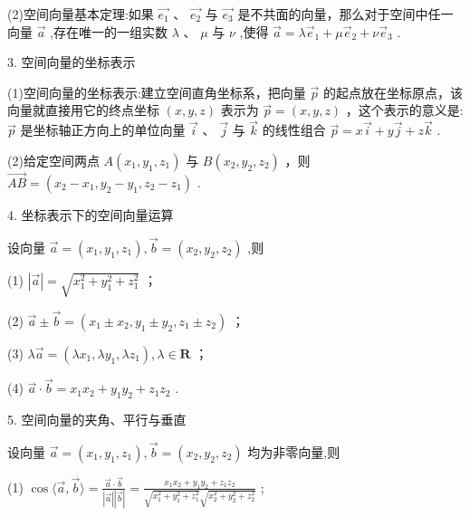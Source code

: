 \documentclass[10pt]{article}
\begin{document}
(2)空间向量基本定理:如果 \(\overrightarrow{{e}_{1}}\text{ 、 }\overrightarrow{{e}_{2}}\) 与 \(\overrightarrow{{e}_{3}}\) 是不共面的向量，那么对于空间中任一向量 \(\overrightarrow{a}\) ,存在唯一的一组实数 \(\lambda \text{ 、 }\mu\) 与 \(\nu\) ,使得 \(\overrightarrow{a} = \lambda {\overrightarrow{e}}_{1} + \mu {\overrightarrow{e}}_{2} + \nu {\overrightarrow{e}}_{3}\) .

3. 空间向量的坐标表示

(1)空间向量的坐标表示:建立空间直角坐标系，把向量 \(\overrightarrow{p}\) 的起点放在坐标原点，该向量就直接用它的终点坐标 \(\left( {x,y,z}\right)\) 表示为 \(\overrightarrow{p} = \left( {x,y,z}\right)\) ，这个表示的意义是: \(\overrightarrow{p}\) 是坐标轴正方向上的单位向量 \(\overrightarrow{i}\text{ 、 }\overrightarrow{j}\) 与 \(\overrightarrow{k}\) 的线性组合 \(\overrightarrow{p} = x\overrightarrow{i} + y\overrightarrow{j} + z\overrightarrow{k}\) .

(2)给定空间两点 \(A\left( {{x}_{1},{y}_{1},{z}_{1}}\right)\) 与 \(B\left( {{x}_{2},{y}_{2},{z}_{2}}\right)\) ，则 \(\overrightarrow{AB} = \left( {{x}_{2} - {x}_{1},{y}_{2} - {y}_{1},{z}_{2} - {z}_{1}}\right)\) .

4. 坐标表示下的空间向量运算

设向量 \(\overrightarrow{a} = \left( {{x}_{1},{y}_{1},{z}_{1}}\right) ,\overrightarrow{b} = \left( {{x}_{2},{y}_{2},{z}_{2}}\right)\) ,则

(1) \(\left| \overrightarrow{a}\right|  = \sqrt{{x}_{1}^{2} + {y}_{1}^{2} + {z}_{1}^{2}}\) ；

(2) \(\overrightarrow{a} \pm  \overrightarrow{b} = \left( {{x}_{1} \pm  {x}_{2},{y}_{1} \pm  {y}_{2},{z}_{1} \pm  {z}_{2}}\right)\) ；

(3) \(\lambda \overrightarrow{a} = \left( {\lambda {x}_{1},\lambda {y}_{1},\lambda {z}_{1}}\right) ,\lambda  \in  \mathbf{R}\) ；

(4) \(\overrightarrow{a} \cdot  \overrightarrow{b} = {x}_{1}{x}_{2} + {y}_{1}{y}_{2} + {z}_{1}{z}_{2}\) .

5. 空间向量的夹角、平行与垂直

设向量 \(\overrightarrow{a} = \left( {{x}_{1},{y}_{1},{z}_{1}}\right) ,\overrightarrow{b} = \left( {{x}_{2},{y}_{2},{z}_{2}}\right)\) 均为非零向量,则

(1) \(\cos \langle \overrightarrow{a},\overrightarrow{b}\rangle  = \frac{\overrightarrow{a} \cdot  \overrightarrow{b}}{\left| \overrightarrow{a}\right| \left| \overrightarrow{b}\right| } = \frac{{x}_{1}{x}_{2} + {y}_{1}{y}_{2} + {z}_{1}{z}_{2}}{\sqrt{{x}_{1}^{2} + {y}_{1}^{2} + {z}_{1}^{2}}\sqrt{{x}_{2}^{2} + {y}_{2}^{2} + {z}_{2}^{2}}}\) ;
\end{document}
